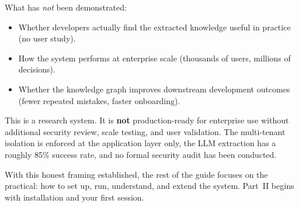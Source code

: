 What has \emph{not} been demonstrated:

\begin{itemize}
    \item Whether developers actually find the extracted knowledge useful in
          practice (no user study).
    \item How the system performs at enterprise scale (thousands of users,
          millions of decisions).
    \item Whether the knowledge graph improves downstream development outcomes
          (fewer repeated mistakes, faster onboarding).
\end{itemize}

\begin{warning}
This is a research system.  It is \textbf{not} production-ready for enterprise
use without additional security review, scale testing, and user validation.
The multi-tenant isolation is enforced at the application layer only, the LLM
extraction has a roughly 85\% success rate, and no formal security audit has
been conducted.
\end{warning}

\noindent
With this honest framing established, the rest of the guide focuses on the
practical: how to set up, run, understand, and extend the system.  Part~II
begins with installation and your first session.
